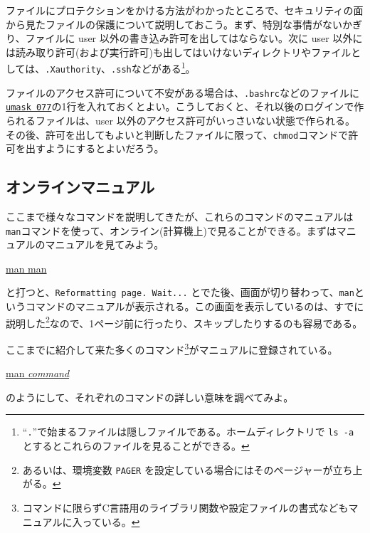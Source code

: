 ファイルにプロテクションをかける方法がわかったところで、セキュリティの面から見たファイルの保護について説明しておこう。まず、特別な事情がないかぎり、ファイルに user 以外の書き込み許可を出してはならない。次に user 以外には読み取り許可(および実行許可)も出してはいけないディレクトリやファイルとしては、\texttt{.Xauthority}、\texttt{.ssh}などがある\footnote{``\texttt{.}''で始まるファイルは隠しファイルである。ホームディレクトリで \texttt{ls -a} とするとこれらのファイルを見ることができる。}。

ファイルのアクセス許可について不安がある場合は、\texttt{.bashrc}などのファイルに
\underline{\texttt{umask 077}}の1行を入れておくとよい。こうしておくと、それ以後のログインで作られるファイルは、user 以外のアクセス許可がいっさいない状態で作られる。その後、許可を出してもよいと判断したファイルに限って、\texttt{chmod}コマンドで許可を出すようにするとよいだろう。

\subsection{オンラインマニュアル}
ここまで様々なコマンドを説明してきたが、これらのコマンドのマニュアルは\texttt{man}コマンドを使って、オンライン(計算機上)で見ることができる。まずはマニュアルのマニュアルを見てみよう。
\begin{commandline2}
    \prompt \underline{man man}
\end{commandline2} \noindent
と打つと、\texttt{Reformatting page.  Wait...} とでた後、画面が切り替わって、\texttt{man}というコマンドのマニュアルが表示される。この画面を表示しているのは、すでに説明した\texttt{\pager}\footnote{あるいは、環境変数 \texttt{PAGER} を設定している場合にはそのページャーが立ち上がる。}なので、1ページ前に行ったり、スキップしたりするのも容易である。

ここまでに紹介して来た多くのコマンド\footnote{コマンドに限らずC言語用のライブラリ関数や設定ファイルの書式などもマニュアルに入っている。}がマニュアルに登録されている。
\begin{commandline2}
    \prompt \underline{man \textit{command}}
\end{commandline2} \noindent
のようにして、それぞれのコマンドの詳しい意味を調べてみよ。

